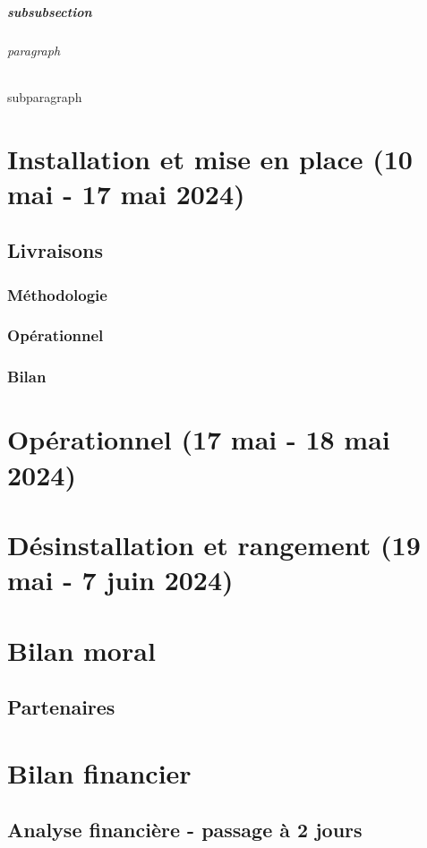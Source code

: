 \documentclass[12pt,a4paper]{report}
\begin{document}
\subsubsection{subsubsection}
\paragraph{paragraph}
\subparagraph{subparagraph}

\part{Installation et mise en place (10 mai - 17 mai 2024)}
\chapter{Livraisons}
\section{Méthodologie}

\section{Opérationnel}

\section{Bilan}

\part{Opérationnel (17 mai - 18 mai 2024)}

\part{Désinstallation et rangement (19 mai - 7 juin 2024)}

\part{Bilan moral}
\chapter{Partenaires}

\part{Bilan financier}
\chapter{Analyse financière - passage à 2 jours}
\end{document}
